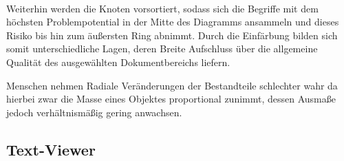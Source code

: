 \\
Weiterhin werden die Knoten vorsortiert, sodass sich die Begriffe mit dem h\"ochsten Problempotential in der Mitte des Diagramms ansammeln und dieses Risiko bis hin zum \"au{\ss}ersten Ring abnimmt. Durch die Einf\"arbung bilden sich somit unterschiedliche Lagen, deren Breite Aufschluss \"uber die allgemeine Qualit\"at des ausgew\"ahlten Dokumentbereichs liefern. 

Menschen nehmen Radiale Ver\"anderungen der Bestandteile schlechter wahr da hierbei zwar die Masse eines Objektes proportional zunimmt, dessen Ausma{\ss}e jedoch verh\"altnism\"a{\ss}ig gering anwachsen.

\subsection{Text-Viewer}